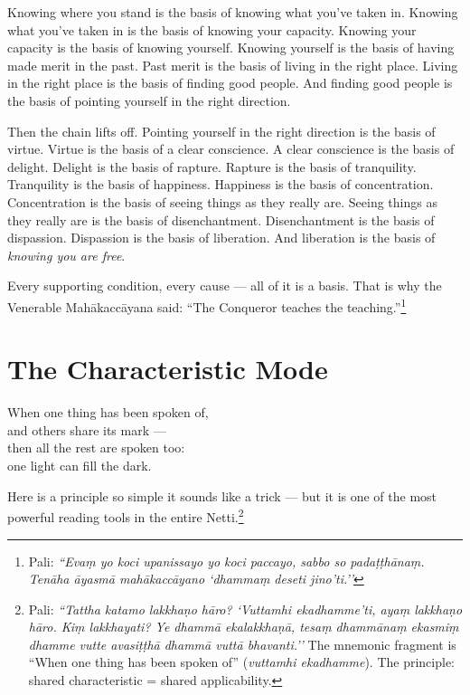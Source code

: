 Knowing where you stand is the basis of knowing what you've taken in. Knowing what you've taken in is the basis of knowing your capacity. Knowing your capacity is the basis of knowing yourself. Knowing yourself is the basis of having made merit in the past. Past merit is the basis of living in the right place. Living in the right place is the basis of finding good people. And finding good people is the basis of pointing yourself in the right direction.

Then the chain lifts off. Pointing yourself in the right direction is the basis of virtue. Virtue is the basis of a clear conscience. A clear conscience is the basis of delight. Delight is the basis of rapture. Rapture is the basis of tranquility. Tranquility is the basis of happiness. Happiness is the basis of concentration. Concentration is the basis of seeing things as they really are. Seeing things as they really are is the basis of disenchantment. Disenchantment is the basis of dispassion. Dispassion is the basis of liberation. And liberation is the basis of \textit{knowing you are free}.

Every supporting condition, every cause --- all of it is a basis. That is why the Venerable Mahākaccāyana said: ``The Conqueror teaches the teaching.''\footnote{Pali: \textit{``Evaṃ yo koci upanissayo yo koci paccayo, sabbo so padaṭṭhānaṃ. Tenāha āyasmā mahākaccāyano `dhammaṃ deseti jino'ti.''}}

\ornament

\section*{The Characteristic Mode}

\begin{versebox}
When one thing has been spoken of,\\
and others share its mark ---\\
then all the rest are spoken too:\\
one light can fill the dark.
\end{versebox}

\noindent Here is a principle so simple it sounds like a trick --- but it is one of the most powerful reading tools in the entire Netti.\footnote{Pali: \textit{``Tattha katamo lakkhaṇo hāro? `Vuttamhi ekadhamme'ti, ayaṃ lakkhaṇo hāro. Kiṃ lakkhayati? Ye dhammā ekalakkhaṇā, tesaṃ dhammānaṃ ekasmiṃ dhamme vutte avasiṭṭhā dhammā vuttā bhavanti.''} The mnemonic fragment is ``When one thing has been spoken of'' (\textit{vuttamhi ekadhamme}). The principle: shared characteristic = shared applicability.}

